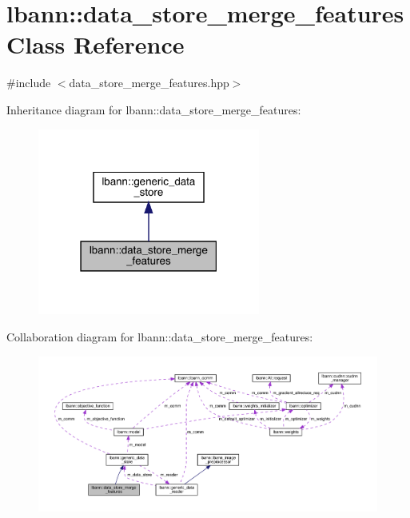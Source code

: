 \hypertarget{classlbann_1_1data__store__merge__features}{}\section{lbann\+:\+:data\+\_\+store\+\_\+merge\+\_\+features Class Reference}
\label{classlbann_1_1data__store__merge__features}


{\ttfamily \#include $<$data\+\_\+store\+\_\+merge\+\_\+features.\+hpp$>$}



Inheritance diagram for lbann\+:\+:data\+\_\+store\+\_\+merge\+\_\+features\+:\nopagebreak
\begin{figure}[H]
\begin{center}
\leavevmode
\includegraphics[width=207pt]{classlbann_1_1data__store__merge__features__inherit__graph}
\end{center}
\end{figure}


Collaboration diagram for lbann\+:\+:data\+\_\+store\+\_\+merge\+\_\+features\+:\nopagebreak
\begin{figure}[H]
\begin{center}
\leavevmode
\includegraphics[width=350pt]{classlbann_1_1data__store__merge__features__coll__graph}
\end{center}
\end{figure}
